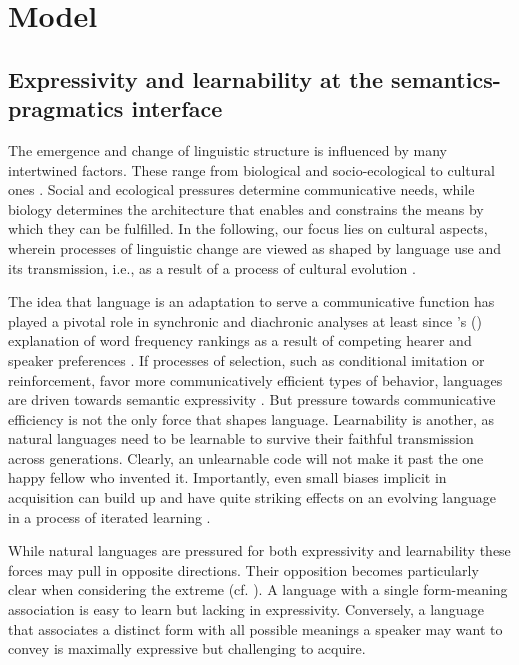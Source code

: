 \documentclass[a4paper]{article}
\newcommand{\citeposs}[2][]{\citeauthor{#2}'s (\citeyear[#1]{#2})}
\begin{document}
\section{Model}
\label{sec:model}

\subsection{Expressivity and learnability at the semantics-pragmatics interface}

The emergence and change of linguistic structure is influenced by many intertwined
factors. These range from biological and socio-ecological to cultural ones \citep{benz+etal:2005b,steels:2011,tamariz+kirby:2016}. Social and ecological pressures determine communicative needs, while
biology determines the architecture that enables and constrains the means by which they can be
fulfilled. In the following, our focus lies on cultural aspects, wherein processes of
linguistic change are viewed as shaped by language use and its transmission, i.e., as a result
of a process of cultural evolution
\citep{Pagel2009:Human-Language-,ThompsonKirby2016:Culture-Shapes-}.

The idea that language is an adaptation to serve a communicative function has played a pivotal
role in synchronic and diachronic analyses at least since \citeposs{zipf:1949} explanation of
word frequency rankings as a result of competing hearer and speaker preferences \citep[e.g., in][]{martinet:1962, horn:1984,jaeger+vRooij:2007,jaeger:2007,
  piantadosi:2014,kirby+etal:2015}. If processes of selection, such as conditional imitation
or reinforcement, favor more communicatively efficient types of behavior, languages are driven
towards semantic expressivity \citep[e.g.,][]{nowak+krakauer:1999,Skyrms2010:Signals}. But
pressure towards communicative efficiency is not the only force that shapes
language. Learnability is another, as natural languages need to be learnable to survive their
faithful transmission across generations. Clearly, an unlearnable code will not make it past
the one happy fellow who invented it. Importantly, even small biases implicit in acquisition
can build up and have quite striking effects on an evolving language in a process
of iterated learning
\citep{KirbyHurford2002:The-Emergence-o,SmithKirby2003:Iterated-Learni,kirby+etal:2014}. 

While natural languages are pressured for both expressivity and learnability these forces may pull in opposite directions. Their opposition becomes particularly clear when
considering the extreme (cf. \citealt{kemp+regier:2012,kirby+etal:2015}). A language with a
single form-meaning association is easy to learn but lacking in expressivity. Conversely, a
language that associates a distinct form with all possible meanings a speaker may want to
convey is maximally expressive but challenging to acquire.
\end{document}
